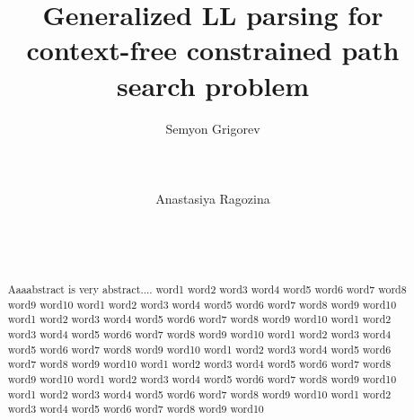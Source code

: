 \documentclass{sig-alternate} %
\begin{document}
\newtheorem{mytheorem}{Theorem}
\newtheorem{lemma}{Lemma}

\makeatletter
\def\@copyrightspace{\relax}
\makeatother

\title{Generalized LL parsing for context-free constrained path search problem}

\sloppy


\author{
\alignauthor
       Semyon Grigorev\\
       \\
       \\
       \\
\alignauthor
       Anastasiya Ragozina\\
       \\
       \\
       \\
}

\maketitle

\begin{abstract}
Aaaabstract is very abstract.... 
word1 word2 word3 word4 word5 word6 word7 word8 word9 word10
word1 word2 word3 word4 word5 word6 word7 word8 word9 word10
word1 word2 word3 word4 word5 word6 word7 word8 word9 word10
word1 word2 word3 word4 word5 word6 word7 word8 word9 word10
word1 word2 word3 word4 word5 word6 word7 word8 word9 word10
word1 word2 word3 word4 word5 word6 word7 word8 word9 word10
word1 word2 word3 word4 word5 word6 word7 word8 word9 word10
word1 word2 word3 word4 word5 word6 word7 word8 word9 word10
word1 word2 word3 word4 word5 word6 word7 word8 word9 word10
word1 word2 word3 word4 word5 word6 word7 word8 word9 word10

\end{abstract}
\end{document}
